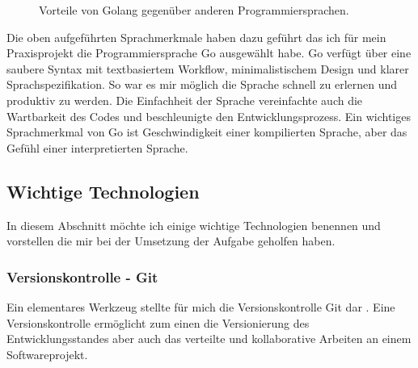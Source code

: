 \documentclass[12pt]{article}
\begin{document}
\begin{figure}[h!]
\centering
{}%
\hfill
{}%
\hfill
\caption{Vorteile von Golang gegenüber anderen Programmiersprachen.}
\end{figure}


Die oben aufgeführten Sprachmerkmale haben dazu geführt das ich für mein Praxisprojekt die Programmiersprache Go ausgewählt habe. Go verfügt über eine saubere Syntax mit textbasiertem Workflow, minimalistischem Design und klarer Sprachspezifikation. So war es mir möglich die Sprache schnell zu erlernen und produktiv zu werden. Die Einfachheit der Sprache vereinfachte auch die Wartbarkeit des Codes und beschleunigte den Entwicklungsprozess. Ein wichtiges Sprachmerkmal von Go ist Geschwindigkeit einer kompilierten Sprache, aber das Gefühl einer interpretierten Sprache.

\subsection{Wichtige Technologien}

In diesem Abschnitt möchte ich einige wichtige Technologien benennen und vorstellen die mir bei der Umsetzung der Aufgabe geholfen haben.

\subsubsection{Versionskontrolle - Git}

Ein elementares Werkzeug stellte für mich die Versionskontrolle Git dar \cite{GIT}. Eine Versionskontrolle ermöglicht zum einen die Versionierung des Entwicklungsstandes aber auch das verteilte und kollaborative Arbeiten an einem Softwareprojekt.
\end{document}
